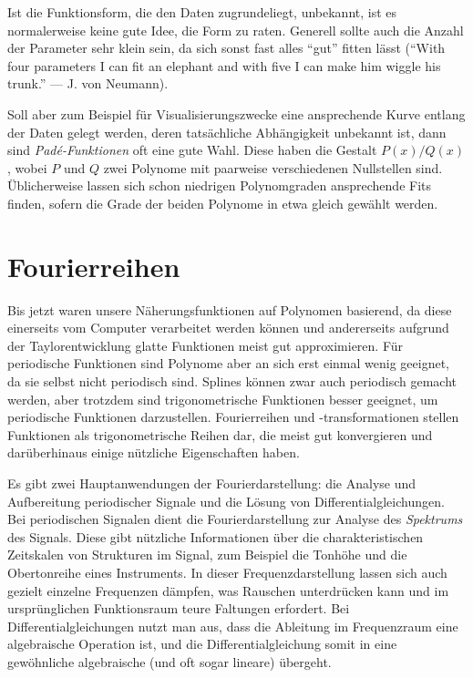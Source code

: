 Ist die Funktionsform, die den Daten zugrundeliegt, unbekannt, ist es
normalerweise keine gute Idee, die Form zu raten. Generell sollte auch
die Anzahl der Parameter sehr klein sein, da sich sonst fast alles
"`gut"' fitten lässt ("`With four parameters I can fit an elephant and
with five I can make him wiggle his trunk."' --- J. von Neumann).

Soll aber zum Beispiel für Visualisierungszwecke eine ansprechende
Kurve entlang der Daten gelegt werden, deren tatsächliche Abhängigkeit
unbekannt ist, dann sind \emph{Pad\'e-Funktionen} oft eine gute
Wahl. Diese haben die Gestalt $P(x)/Q(x)$, wobei $P$ und $Q$ zwei
Polynome mit paarweise verschiedenen Nullstellen sind. Üblicherweise
lassen sich schon niedrigen Polynomgraden ansprechende Fits finden,
sofern die Grade der beiden Polynome in etwa gleich gewählt werden.

\section{Fourierreihen}

Bis jetzt waren unsere Näherungsfunktionen auf Polynomen basierend, da
diese einerseits vom Computer verarbeitet werden können und
andererseits aufgrund der Taylorentwicklung glatte Funktionen meist
gut approximieren. Für periodische Funktionen sind Polynome aber an
sich erst einmal wenig geeignet, da sie selbst nicht periodisch
sind. Splines können zwar auch periodisch gemacht werden, aber
trotzdem sind trigonometrische Funktionen besser geeignet, um
periodische Funktionen darzustellen. Fourierreihen und
-transformationen stellen Funktionen als trigonometrische Reihen dar,
die meist gut konvergieren und darüberhinaus einige nützliche
Eigenschaften haben.

Es gibt zwei Hauptanwendungen der Fourierdarstellung: die Analyse und
Aufbereitung periodischer Signale und die Lösung von
Differentialgleichungen.  Bei periodischen Signalen dient die
Fourierdarstellung zur Analyse des \emph{Spektrums} des Signals.
Diese gibt nützliche Informationen über die charakteristischen
Zeitskalen von Strukturen im Signal, zum Beispiel die Tonhöhe und die
Obertonreihe eines Instruments. In dieser Frequenzdarstellung lassen
sich auch gezielt einzelne Frequenzen dämpfen, was Rauschen
unterdrücken kann und im ursprünglichen Funktionsraum teure Faltungen
erfordert.  Bei Differentialgleichungen nutzt man aus, dass die
Ableitung im Frequenzraum eine algebraische Operation ist, und die
Differentialgleichung somit in eine gewöhnliche algebraische (und oft
sogar lineare) übergeht.

